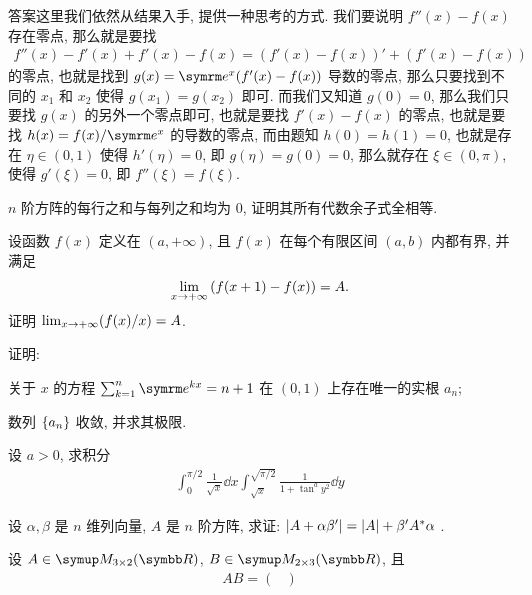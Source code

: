 \documentclass{ctexart}
\begin{document}
\begin{exercise}[series=exer]
\begin{hint}
    \end{hint}
    \begin{answer}
        答案这里我们依然从结果入手, 提供一种思考的方式. 我们要说明 $ f''(x) - f(x) $ 存在零点, 那么就是要找
        \begin{align*}
            f''(x) - f'(x) + f'(x) - f(x) = (f'(x) - f(x))' + (f'(x) - f(x))
        \end{align*}
        的零点, 也就是找到 $ g(x) = \me^{x}(f'(x) - f(x)) $ 导数的零点, 那么只要找到不同的 $ x_{1} $ 和 $ x_{2} $ 使得 $ g(x_{1}) = g(x_{2}) $ 即可. 而我们又知道 $ g(0) = 0 $, 那么我们只要找 $ g(x) $ 的另外一个零点即可, 也就是要找 $ f'(x) - f(x) $ 的零点, 也就是要找 $ h(x) = f(x)/\me^{x} $ 的导数的零点, 而由题知 $ h(0) = h(1) = 0 $, 也就是存在 $ \eta\in(0, 1) $ 使得 $ h'(\eta) = 0 $, 即 $ g(\eta) = g(0) = 0 $, 那么就存在 $ \xi \in (0, \pi) $, 使得 $ g'(\xi) = 0 $, 即 $ f''(\xi) = f(\xi) $. 
    \end{answer}
    \item $ n $ 阶方阵的每行之和与每列之和均为 0, 证明其所有代数余子式全相等.
    \item 设函数 $ f(x) $ 定义在 $ (a, +\infty) $, 且 $ f(x) $ 在每个有限区间 $ (a, b) $ 内都有界, 并满足
    \begin{align*}
        \lim_{x \to +\infty} \qty(f(x + 1) - f(x)) = A.
    \end{align*}
    证明 $ \lim_{x \to +\infty} (f(x) / x) = A $. 
    \item 证明: \begin{exercise}
        \item 关于 $ x $ 的方程 $ \sum_{k=1}^{n} \me^{kx} = n + 1 $ 在 $ (0, 1) $ 上存在唯一的实根 $ a_{n} $;
        \item 数列 $ \qty{a_{n}} $ 收敛, 并求其极限.
    \end{exercise}
    \item 设 $ a > 0 $, 求积分
    \begin{align*}
        \int_{0}^{\pi/2} \frac{1}{\sqrt{x}} \dd{x} \int_{\sqrt{x}}^{\sqrt{\pi/2}} \frac{1}{1 + \tan^{a}y^{2}} \dd{y}
    \end{align*}
    \item 设 $ \alpha, \beta $ 是 $ n $ 维列向量, $ A $ 是 $ n $ 阶方阵, 求证: $ \abs{A + \alpha\beta'} = \abs{A} + \beta'A^{*}\alpha $ . 
    \item 设 $ A \in \MM[\R][3\times 2] $, $ B \in \MM[\R][2 \times 3] $, 且
    \begin{align*}
        AB = \begin{pmatrix}

\end{pmatrix}
\end{align*}
\end{exercise}
\end{document}
